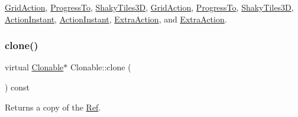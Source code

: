 \hyperlink{classGridAction_a081a9340e9289cf2dcbb6bde121d4f24}{Grid\+Action}, \hyperlink{classProgressTo_a993bf559112f3bbe3f4d38027711fd8e}{Progress\+To}, \hyperlink{classShakyTiles3D_aefe37a5cda9d6898ad9c573e5a220ce1}{Shaky\+Tiles3D}, \hyperlink{classGridAction_a081a9340e9289cf2dcbb6bde121d4f24}{Grid\+Action}, \hyperlink{classProgressTo_a55a418dbd387fca470d425df87291b0b}{Progress\+To}, \hyperlink{classShakyTiles3D_ad83d154be5494000eb8fcfe657e503ff}{Shaky\+Tiles3D}, \hyperlink{classActionInstant_adb76fc6f006098109e8256210cbd8cc0}{Action\+Instant}, \hyperlink{classActionInstant_adb76fc6f006098109e8256210cbd8cc0}{Action\+Instant}, \hyperlink{classExtraAction_ab934c199930dec4d3bff42d61ce940da}{Extra\+Action}, and \hyperlink{classExtraAction_a758a349952071ad00b74ddf34cfa9b2a}{Extra\+Action}.

\mbox{\label{classClonable_a36b05a0fa605f4f269e5884bde7f9e0c}} 
\subsubsection{\texorpdfstring{clone()}{clone()}\hspace{0.1cm}{\footnotesize\ttfamily [2/2]}}
{\footnotesize\ttfamily virtual \hyperlink{classClonable}{Clonable}$\ast$ Clonable\+::clone (\begin{DoxyParamCaption}{ }\end{DoxyParamCaption}) const\hspace{0.3cm}{\ttfamily [pure virtual]}}

Returns a copy of the \hyperlink{classRef}{Ref}. 

